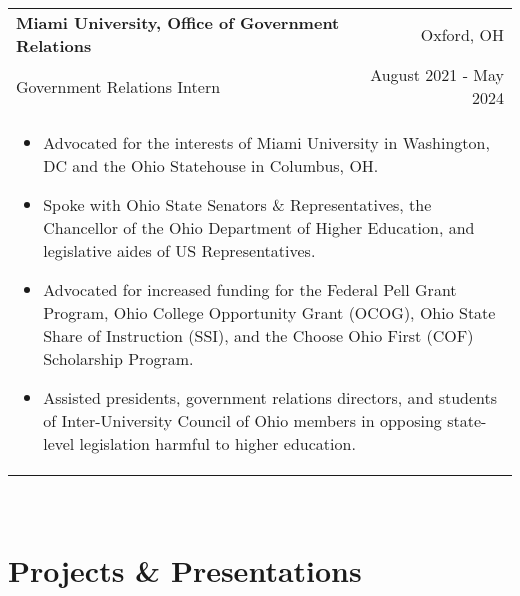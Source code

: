 \documentclass[letterpaper,10pt]{article} %
\begin{document}
\begin{tabular*}{\linewidth}{@{\extracolsep{\fill}} lr }
\textbf{Miami University, Office of Government Relations} & \footnotesize{Oxford, OH}\\
\footnotesize{Government Relations Intern} & \footnotesize{August 2021 - May 2024}\\
\multicolumn{2}{p{\linewidth}}{
    \scriptsize{\vspace{-3.25mm}\begin{itemize}
        \item Advocated for the interests of Miami University in Washington, DC and the Ohio Statehouse in Columbus, OH.
        \item Spoke with Ohio State Senators \& Representatives, the Chancellor of the Ohio Department of Higher Education, and legislative aides of US Representatives.
        \item Advocated for increased funding for the Federal Pell Grant Program, Ohio College Opportunity Grant (OCOG), Ohio State Share of Instruction (SSI), and the Choose Ohio First (COF) Scholarship Program.
        \item Assisted presidents, government relations directors, and students of Inter-University Council of Ohio members in opposing state-level legislation harmful to higher education.
    \end{itemize}}
}\\
\end{tabular*}\\

\section{Projects \& Presentations}
\end{document}
